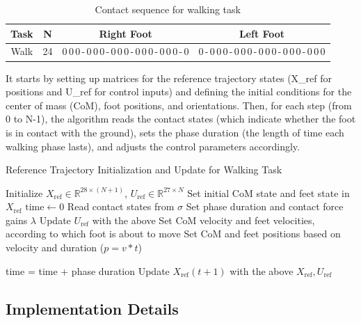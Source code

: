 \documentclass[main.tex]{subfiles}
\begin{document}
\begin{table}[H]
\centering
\caption{Contact sequence for walking task}
\label{tab:cs_walk}
\begin{tabular}{|c|c|c|c|}
\hline
\textbf{Task} & \textbf{N} & \textbf{Right Foot} & \textbf{Left Foot} \\
\hline
Walk & 24 & 0\,0\,0\,-\,0\,0\,0\,-\,0\,0\,0\,-\,0\,0\,0\,-\,0\,0\,0\,-\,0 & 0\,-\,0\,0\,0\,-\,0\,0\,0\,-\,0\,0\,0\,-\,0\,0\,0\,-\,0\,0\,0 \\
\hline
\end{tabular}
\end{table}

It starts by setting up matrices for the reference trajectory states (X\_ref for positions and U\_ref for control inputs) and defining the initial conditions for the center of mass (CoM), foot positions, and orientations. Then, for each step (from 0 to N-1), the algorithm reads the contact states (which indicate whether the foot is in contact with the ground), sets the phase duration (the length of time each walking phase lasts), and adjusts the control parameters accordingly.
\begin{algorithm}[H]
\caption{Reference Trajectory Initialization and Update for Walking Task}
\begin{algorithmic}[1]
\State Initialize $X_{\text{ref}} \in \mathbb{R}^{28 \times (N+1)}$, $U_{\text{ref}} \in \mathbb{R}^{27 \times N}$
\State Set initial CoM state and feet state in $X_{\text{ref}}$
\State $\text{time} \gets 0$
    \State Read contact states from $\sigma$
    \State Set phase duration and contact force gains $\lambda$
    \State Update $U_{\text{ref}}$ with the above
    \State Set CoM velocity and feet velocities, according to which foot is about to move
    \State Set CoM and feet positions based on velocity and duration ($p = v * t$)
    
    \State time = time + phase duration
    \State Update $X_{\text{ref}}(t+1)$ with the above 
\EndFor
\State \Return $X_{\text{ref}}, U_{\text{ref}}$
\end{algorithmic}
\end{algorithm}

\subsection{Implementation Details}
\end{document}
